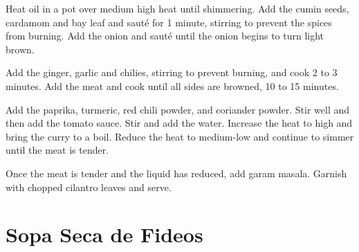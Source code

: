 \documentclass[oneside]{book}  %
\def\thisrecipe{}  %
\newcommand{\recipe}[1]{\section{#1}\def\thisrecipe{: #1}} %
\begin{document}
\begin{directions}
  \item Heat oil in a pot over medium high heat until shimmering. Add the cumin
  seeds, cardamom and bay leaf and saut\'e for 1 minute, stirring to prevent the
  spices from burning. Add the onion and saut\'e until the onion begins to turn
  light brown.

  \item Add the ginger, garlic and chilies, stirring to prevent burning, and
  cook 2 to 3 minutes. Add the meat and cook until all sides are browned, 10
  to 15 minutes.

  \item Add the paprika, turmeric, red chili powder, and coriander powder. Stir
  well and then add the tomato sauce. Stir and add the water. Increase the heat
  to high and bring the curry to a boil. Reduce the heat to medium-low and
  continue to simmer until the meat is tender.

  \item Once the meat is tender and the liquid has reduced, add garam masala.
  Garnish with chopped cilantro leaves and serve.
\end{directions}
\recipe{Sopa Seca de Fideos} \label{recipe:sopa_seca_de_fideos} %
\end{document}

